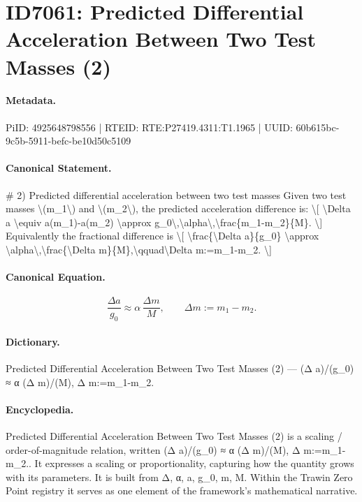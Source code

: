 \section*{ID7061: Predicted Differential Acceleration Between Two Test Masses (2)}
\paragraph{Metadata.}
PiID: 4925648798556 | RTEID: RTE:P27419.4311:T1.1965 | UUID: 60b615bc-9c5b-5911-befc-be10d50c5109

\paragraph{Canonical Statement.}
\# 2) Predicted differential acceleration between two test masses Given two test masses \textbackslash{}(m\_1\textbackslash{}) and \textbackslash{}(m\_2\textbackslash{}), the predicted acceleration difference is: \textbackslash{}[ \textbackslash{}Delta a \textbackslash{}equiv a(m\_1)-a(m\_2) \textbackslash{}approx g\_0\textbackslash{},\textbackslash{}alpha\textbackslash{},\textbackslash{}frac\{m\_1-m\_2\}\{M\}. \textbackslash{}] Equivalently the fractional difference is \textbackslash{}[ \textbackslash{}frac\{\textbackslash{}Delta a\}\{g\_0\} \textbackslash{}approx \textbackslash{}alpha\textbackslash{},\textbackslash{}frac\{\textbackslash{}Delta m\}\{M\},\textbackslash{}qquad\textbackslash{}Delta m:=m\_1-m\_2. \textbackslash{}]

\paragraph{Canonical Equation.}
\[
\frac{\Delta a}{g_0} \approx \alpha\,\frac{\Delta m}{M},\qquad\Delta m:=m_1-m_2.
\]

\paragraph{Dictionary.}
Predicted Differential Acceleration Between Two Test Masses (2) — (Δ a)/(g\_0) ≈ α (Δ m)/(M), Δ m:=m\_1-m\_2.

\paragraph{Encyclopedia.}
Predicted Differential Acceleration Between Two Test Masses (2) is a scaling / order-of-magnitude relation, written (Δ a)/(g\_0) ≈ α (Δ m)/(M), Δ m:=m\_1-m\_2.. It expresses a scaling or proportionality, capturing how the quantity grows with its parameters. It is built from Δ, α, a, g\_0, m, M. Within the Trawin Zero Point registry it serves as one element of the framework's mathematical narrative.
